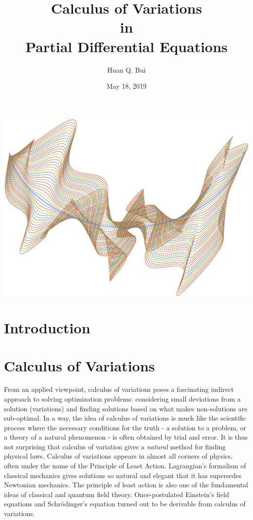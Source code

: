 \documentclass{article}
\title{Calculus of Variations\\in\\Partial Differential Equations}
\author{Huan Q. Bui}
\date{May 18, 2019}
\begin{document}
\maketitle
\begin{center}
\includegraphics[scale=0.55,angle=270]{intro.eps}\\
\end{center}



\newpage
\tableofcontents
\newpage
{}
\section{Introduction}



\section{Calculus of Variations}

From an applied viewpoint, calculus of variations poses a fascinating indirect approach to solving optimization problems: considering small deviations from a solution (variations) and finding solutions based on what makes non-solutions are sub-optimal. In a way, the idea of calculus of variations is much like the scientific process where the necessary conditions for the truth - a solution to a problem, or a theory of a natural phenomenon - is often obtained by trial and error. It is thus not surprising that calculus of variation gives a \textit{natural} method for finding physical laws. Calculus of variations appears in almost all corners of physics, often under the name of the Principle of Least Action. Lagrangian's formalism of classical mechanics gives solutions so natural and elegant that it has supersedes Newtonian mechanics. The principle of least action is also one of the fundamental ideas of classical and quantum field theory. Once-postulated Einstein's field equations and Schr\"{o}dinger's equation turned out to be derivable from calculus of variations.   
\end{document}
